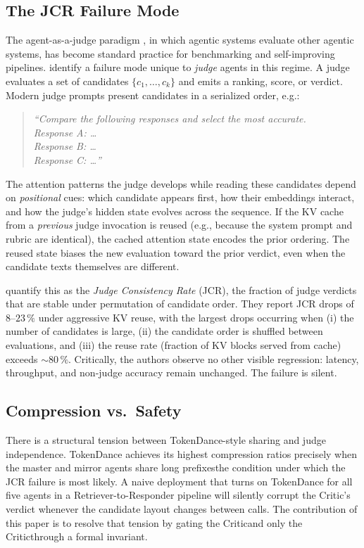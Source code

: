 \documentclass[10pt,twocolumn]{article}
\begin{document}
\subsection{The JCR Failure Mode}
\label{sec:bg:jcr}

The agent-as-a-judge paradigm \cite{agentjudge}, in which agentic systems
evaluate other agentic systems, has become standard practice for
benchmarking and self-improving pipelines. \cite{jcrfailure} identify a
failure mode unique to \emph{judge} agents in this regime.
A judge evaluates a set of candidates $\{c_1, \ldots, c_k\}$ and emits a
ranking, score, or verdict. Modern judge prompts present candidates in a
serialized order, e.g.:
\begin{quote}
\small
\textit{``Compare the following responses and select the most accurate.\\
Response A: \ldots \\ Response B: \ldots \\ Response C: \ldots''}
\end{quote}
The attention patterns the judge develops while reading these candidates
depend on \emph{positional} cues: which candidate appears first, how their
embeddings interact, and how the judge's hidden state evolves across the
sequence. If the KV cache from a \emph{previous} judge invocation is reused
(e.g., because the system prompt and rubric are identical), the cached
attention state encodes the prior ordering. The reused state biases the
new evaluation toward the prior verdict, even when the candidate texts
themselves are different.

\cite{jcrfailure} quantify this as the \emph{Judge Consistency Rate} (JCR),
the fraction of judge verdicts that are stable under permutation of
candidate order. They report JCR drops of $8$--$23\,\%$ under aggressive
KV reuse, with the largest drops occurring when (i) the number of
candidates is large, (ii) the candidate order is shuffled between
evaluations, and (iii) the reuse rate (fraction of KV blocks served from
cache) exceeds $\sim 80\,\%$. Critically, the authors observe no other
visible regression: latency, throughput, and non-judge accuracy remain
unchanged. The failure is silent.

\subsection{Compression vs.\ Safety}
\label{sec:bg:tension}

There is a structural tension between TokenDance-style sharing and judge
independence. TokenDance achieves its highest compression ratios precisely
when the master and mirror agents share long prefixes\textemdash the
condition under which the JCR failure is most likely. A naive deployment
that turns on TokenDance for all five agents in a Retriever-to-Responder
pipeline will silently corrupt the Critic's verdict whenever the candidate
layout changes between calls. The contribution of this paper is to resolve
that tension by gating the Critic\textemdash and only the
Critic\textemdash through a formal invariant.
\end{document}
